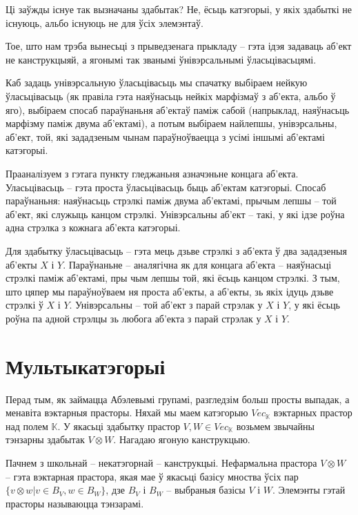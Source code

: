 \documentclass[a4paper,12pt]{book}
\begin{document}
Ці заўжды існуе так вызначаны здабытак? Не, ёсьць катэгорыі, у якіх
здабыткі не існуюць, альбо існуюць не для ўсіх элемэнтаў.

Тое, што нам трэба вынесьці з прыведзенага прыкладу -- гэта ідэя
задаваць аб'ект не канструкцыяй, а ягонымі так званымі ўнівэрсальнымі
ўласьцівасьцямі.

Каб задаць унівэрсальную ўласьцівасьць мы спачатку выбіраем нейкую
ўласьцівасьць (як правіла гэта наяўнасьць нейкіх марфізмаў з аб'екта,
альбо ў яго), выбіраем спосаб параўнаньня аб'ектаў паміж сабой
(напрыклад, наяўнасьць марфізму паміж двума аб'ектамі), а потым
выбіраем найлепшы, унівэрсальны, аб'ект, той, які зададзеным чынам
параўноўваецца з усімі іншымі аб'ектамі катэгорыі.

Прааналізуем з гэтага пункту гледжаньня азначэньне концага
аб'екта. Уласьцівасьць -- гэта проста ўласьцівасьць быць аб'ектам
катэгорыі. Спосаб параўнаньня: наяўнасьць стрэлкі паміж двума
аб'ектамі, прычым лепшы -- той аб'ект, які служыць канцом
стрэлкі. Унівэрсальны аб'ект -- такі, у які ідзе роўна адна стрэлка з
кожнага аб'екта катэгорыі.

Для здабытку ўласьцівасьць -- гэта мець дзьве стрэлкі з аб'екта ў два
зададзеныя аб'екты $X$ і $Y$. Параўнаньне -- аналягічна як для концага
аб'екта
-- наяўнасьці стрэлкі паміж аб'ектамі, пры чым лепшы той, які ёсьць
канцом стрэлкі. З тым, што цяпер мы параўноўваем ня проста аб'екты, а
аб'екты, зь якіх ідуць дзьве стрэлкі ў $X$ і $Y$.
Унівэрсальны -- той аб'ект з парай стрэлак у $X$ і $Y$, у які ёсьць роўна
па адной стрэлцы зь любога аб'екта з парай стрэлак у $X$ і $Y$.

\section{Мультыкатэгорыі}

Перад тым, як займацца Абэлевымі групамі, разгледзім больш просты
выпадак, а менавіта вэктарныя прасторы. Няхай мы маем катэгорыю
$Vec_{\mathbb{K}}$ вэктарных прастор
над полем $\mathbb{K}$. У якасьці здабытку прастор $V, W \in
Vec_{\mathbb{K}}$ возьмем звычайны тэнзарны здабытак $V \otimes
W$. Нагадаю ягоную канструкцыю.

Пачнем з школьнай -- некатэгорнай -- канструкцыі. Нефармальна прастора
$V \otimes W$ -- гэта вэктарная прастора, якая мае ў якасьці базісу
мноства ўсіх пар $\{v \otimes w|v \in B_V, w \in B_W\}$, дзе $B_V$ і
$B_W$ -- выбраныя базісы $V$ і $W$. Элемэнты гэтай
прасторы называюцца тэнзарамі.
\end{document}
